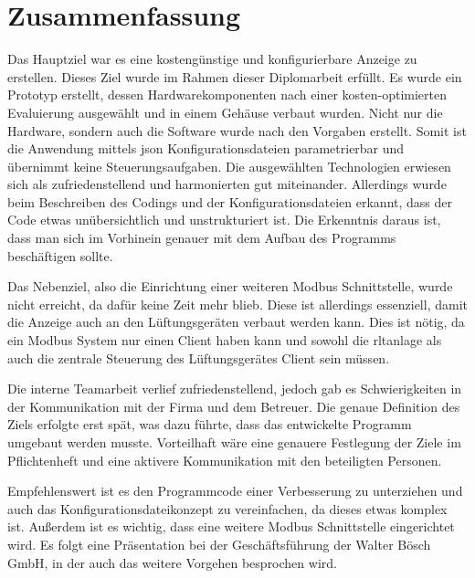 \ifoot{\leftmark}
\chapter{Zusammenfassung}
\noindent Das Hauptziel war es eine kostengünstige und konfigurierbare Anzeige zu erstellen. Dieses Ziel wurde im Rahmen dieser Diplomarbeit erfüllt. Es wurde ein Prototyp erstellt, dessen Hardwarekomponenten nach einer kosten-optimierten Evaluierung ausgewählt und in einem Gehäuse verbaut wurden. Nicht nur die Hardware, sondern auch die Software wurde nach den Vorgaben erstellt. Somit ist die Anwendung mittels \acs{json} Konfigurationsdateien parametrierbar und übernimmt keine Steuerungsaufgaben. Die ausgewählten Technologien erwiesen sich als zufriedenstellend und harmonierten gut miteinander. Allerdings wurde beim Beschreiben des Codings und der Konfigurationsdateien erkannt, dass der Code etwas unübersichtlich und unstrukturiert ist. Die Erkenntnis daraus ist, dass man sich im Vorhinein genauer mit dem Aufbau des Programms beschäftigen sollte.

Das Nebenziel, also die Einrichtung einer weiteren Modbus Schnittstelle, wurde nicht erreicht, da dafür keine Zeit mehr blieb. Diese ist allerdings essenziell, damit die Anzeige auch an den Lüftungsgeräten verbaut werden kann. Dies ist nötig, da ein Modbus System nur einen Client haben kann und sowohl die \acs{rltanlage} als auch die zentrale Steuerung des Lüftungsgerätes Client sein müssen.

Die interne Teamarbeit verlief zufriedenstellend, jedoch gab es Schwierigkeiten in der Kommunikation mit der Firma und dem Betreuer. Die genaue Definition des Ziels erfolgte erst spät, was dazu führte, dass das entwickelte Programm umgebaut werden musste. Vorteilhaft wäre eine genauere Festlegung der Ziele im Pflichtenheft und eine aktivere Kommunikation mit den beteiligten Personen.

Empfehlenswert ist es den Programmcode einer Verbesserung zu unterziehen und auch das Konfigurationsdateikonzept zu vereinfachen, da dieses etwas komplex ist. Außerdem ist es wichtig, dass eine weitere Modbus Schnittstelle eingerichtet wird.
Es folgt eine Präsentation bei der Geschäftsführung der Walter Bösch GmbH, in der auch das weitere Vorgehen besprochen wird.
